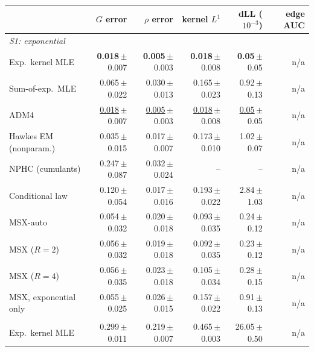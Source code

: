 \begin{tabular}{lrrrrr}
\toprule
& $G$ error & $\rho$ error & kernel $L^1$ & dLL ($10^{-3}$) & edge AUC \\
\midrule
\multicolumn{6}{l}{\textit{S1: exponential}} \\[1pt]
\quad Exp.\ kernel MLE & \textbf{0.018}{\scriptsize\,$\pm$0.007} & \textbf{0.005}{\scriptsize\,$\pm$0.003} & \textbf{0.018}{\scriptsize\,$\pm$0.008} & \textbf{0.05}{\scriptsize\,$\pm$0.05} & n/a \\
\quad Sum-of-exp.\ MLE & 0.065{\scriptsize\,$\pm$0.022} & 0.030{\scriptsize\,$\pm$0.013} & 0.165{\scriptsize\,$\pm$0.023} & 0.92{\scriptsize\,$\pm$0.13} & n/a \\
\quad ADM4 & \underline{0.018}{\scriptsize\,$\pm$0.007} & \underline{0.005}{\scriptsize\,$\pm$0.003} & \underline{0.018}{\scriptsize\,$\pm$0.008} & \underline{0.05}{\scriptsize\,$\pm$0.05} & n/a \\
\quad Hawkes EM (nonparam.) & 0.035{\scriptsize\,$\pm$0.015} & 0.017{\scriptsize\,$\pm$0.007} & 0.173{\scriptsize\,$\pm$0.010} & 1.02{\scriptsize\,$\pm$0.07} & n/a \\
\quad NPHC (cumulants) & 0.247{\scriptsize\,$\pm$0.087} & 0.032{\scriptsize\,$\pm$0.024} & -- & -- & n/a \\
\quad Conditional law & 0.120{\scriptsize\,$\pm$0.054} & 0.017{\scriptsize\,$\pm$0.016} & 0.193{\scriptsize\,$\pm$0.022} & 2.84{\scriptsize\,$\pm$1.03} & n/a \\
\rowcolor{oursbg} \quad MSX-auto & 0.054{\scriptsize\,$\pm$0.032} & 0.020{\scriptsize\,$\pm$0.018} & 0.093{\scriptsize\,$\pm$0.035} & 0.24{\scriptsize\,$\pm$0.12} & n/a \\
\rowcolor{oursbg} \quad MSX ($R=2$) & 0.056{\scriptsize\,$\pm$0.032} & 0.019{\scriptsize\,$\pm$0.018} & 0.092{\scriptsize\,$\pm$0.035} & 0.23{\scriptsize\,$\pm$0.12} & n/a \\
\rowcolor{oursbg} \quad MSX ($R=4$) & 0.056{\scriptsize\,$\pm$0.035} & 0.023{\scriptsize\,$\pm$0.018} & 0.105{\scriptsize\,$\pm$0.034} & 0.28{\scriptsize\,$\pm$0.15} & n/a \\
\rowcolor{oursbg} \quad MSX, exponential only & 0.055{\scriptsize\,$\pm$0.025} & 0.026{\scriptsize\,$\pm$0.015} & 0.157{\scriptsize\,$\pm$0.022} & 0.91{\scriptsize\,$\pm$0.13} & n/a \\
\addlinespace[3pt]\multicolumn{6}{l}{\textit{S2: power law}} \\[1pt]
\quad Exp.\ kernel MLE & 0.299{\scriptsize\,$\pm$0.011} & 0.219{\scriptsize\,$\pm$0.007} & 0.465{\scriptsize\,$\pm$0.003} & 26.05{\scriptsize\,$\pm$0.50} & n/a \\

\end{tabular}
